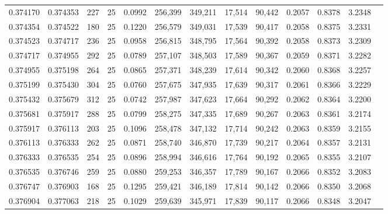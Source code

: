 \begin{tabular}{rrrrrrrrrrrrr}
0.374170 & 0.374353 &   227 &  25 &                                     0.0992 & 256,399 & 349,211 &  17,514 &  90,442 & 0.2057 & 0.8378 & 3.2348 \\
0.374354 & 0.374522 &   180 &  25 &                                     0.1220 & 256,579 & 349,031 &  17,539 &  90,417 & 0.2058 & 0.8375 & 3.2331 \\
0.374523 & 0.374717 &   236 &  25 &                                     0.0958 & 256,815 & 348,795 &  17,564 &  90,392 & 0.2058 & 0.8373 & 3.2309 \\
0.374717 & 0.374955 &   292 &  25 &                                     0.0789 & 257,107 & 348,503 &  17,589 &  90,367 & 0.2059 & 0.8371 & 3.2282 \\
0.374955 & 0.375198 &   264 &  25 &                                     0.0865 & 257,371 & 348,239 &  17,614 &  90,342 & 0.2060 & 0.8368 & 3.2257 \\
0.375199 & 0.375430 &   304 &  25 &                                     0.0760 & 257,675 & 347,935 &  17,639 &  90,317 & 0.2061 & 0.8366 & 3.2229 \\
0.375432 & 0.375679 &   312 &  25 &                                     0.0742 & 257,987 & 347,623 &  17,664 &  90,292 & 0.2062 & 0.8364 & 3.2200 \\
0.375681 & 0.375917 &   288 &  25 &                                     0.0799 & 258,275 & 347,335 &  17,689 &  90,267 & 0.2063 & 0.8361 & 3.2174 \\
0.375917 & 0.376113 &   203 &  25 &                                     0.1096 & 258,478 & 347,132 &  17,714 &  90,242 & 0.2063 & 0.8359 & 3.2155 \\
0.376113 & 0.376333 &   262 &  25 &                                     0.0871 & 258,740 & 346,870 &  17,739 &  90,217 & 0.2064 & 0.8357 & 3.2131 \\
0.376333 & 0.376535 &   254 &  25 &                                     0.0896 & 258,994 & 346,616 &  17,764 &  90,192 & 0.2065 & 0.8355 & 3.2107 \\
0.376535 & 0.376746 &   259 &  25 &                                     0.0880 & 259,253 & 346,357 &  17,789 &  90,167 & 0.2066 & 0.8352 & 3.2083 \\
0.376747 & 0.376903 &   168 &  25 &                                     0.1295 & 259,421 & 346,189 &  17,814 &  90,142 & 0.2066 & 0.8350 & 3.2068 \\
0.376904 & 0.377063 &   218 &  25 &                                     0.1029 & 259,639 & 345,971 &  17,839 &  90,117 & 0.2066 & 0.8348 & 3.2047 \\

\end{tabular}

